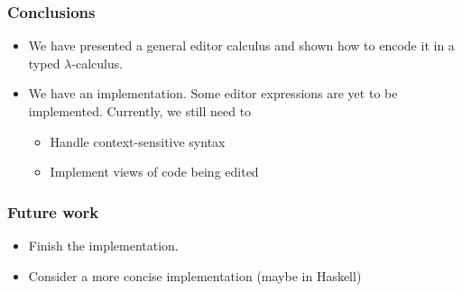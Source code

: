 \documentclass[t,24pt,aspectratio=169]{beamer}
\begin{document}
\begin{frame}[hvid]
    \frametitle{Conclusions}
    \begin{itemize}
      
    \item We have presented a general editor calculus and shown how to
      encode it in a typed $\lambda$-calculus.
        \item We have an implementation. Some editor expressions
          are yet to be implemented. Currently, we still need to
              \begin{itemize}
                  \item Handle context-sensitive syntax
                  \item Implement views of code being edited
              \end{itemize}
    \end{itemize}
\end{frame}


\begin{frame}[hvid]
    \frametitle{Future work}

    \begin{itemize}
        \item Finish the implementation.
        \item Consider a more concise implementation (maybe in Haskell)
    \end{itemize}
\end{frame}
\end{document}
